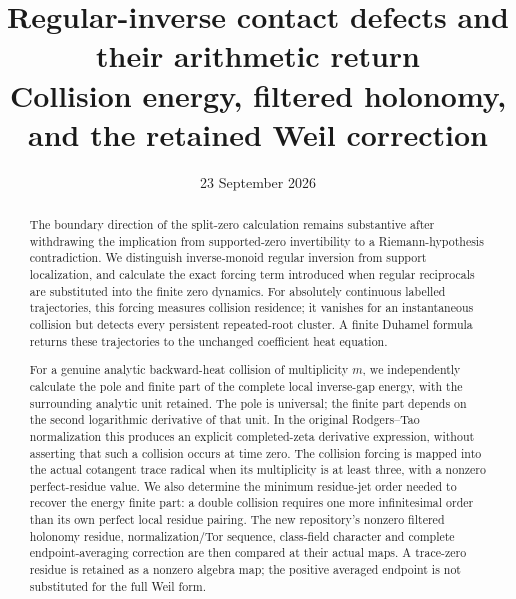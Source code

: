 \documentclass[11pt,a4paper]{article}
\title{Regular-inverse contact defects and their arithmetic return\\[4pt]
\large Collision energy, filtered holonomy, and the retained Weil correction}
\author{}
\date{23 September 2026}
\theoremstyle{definition}
\begin{document}
\maketitle
\begin{abstract}
The boundary direction of the split-zero calculation remains substantive after withdrawing the implication from supported-zero invertibility to a Riemann-hypothesis contradiction. We distinguish inverse-monoid regular inversion from support localization, and calculate the exact forcing term introduced when regular reciprocals are substituted into the finite zero dynamics. For absolutely continuous labelled trajectories, this forcing measures collision residence; it vanishes for an instantaneous collision but detects every persistent repeated-root cluster. A finite Duhamel formula returns these trajectories to the unchanged coefficient heat equation.

For a genuine analytic backward-heat collision of multiplicity $m$, we independently calculate the pole and finite part of the complete local inverse-gap energy, with the surrounding analytic unit retained. The pole is universal; the finite part depends on the second logarithmic derivative of that unit. In the original Rodgers--Tao normalization this produces an explicit completed-zeta derivative expression, without asserting that such a collision occurs at time zero. The collision forcing is mapped into the actual cotangent trace radical when its multiplicity is at least three, with a nonzero perfect-residue value. We also determine the minimum residue-jet order needed to recover the energy finite part: a double collision requires one more infinitesimal order than its own perfect local residue pairing. The new repository's nonzero filtered holonomy residue, normalization/Tor sequence, class-field character and complete endpoint-averaging correction are then compared at their actual maps. A trace-zero residue is retained as a nonzero algebra map; the positive averaged endpoint is not substituted for the full Weil form.
\end{abstract}
\setcounter{tocdepth}{1}
\tableofcontents
\clearpage
\end{document}
